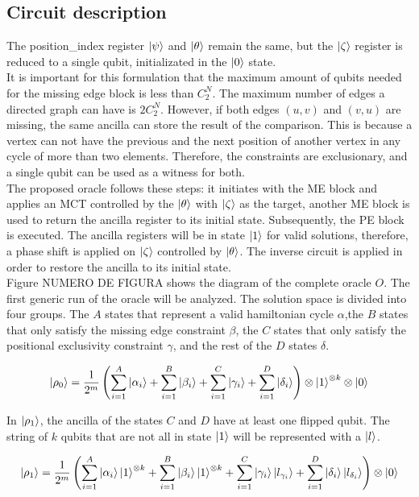 \documentclass[10pt,a4paper]{article}
\begin{document}
\subsection{Circuit description}
The position\_index register $\ket{\psi}$ and $\ket{\theta}$ remain the same, but the $\ket{\zeta}$ register is reduced to a single qubit, initializated in the $\ket{0}$ state.\\
It is important for this formulation that the maximum amount of qubits needed for the missing edge block is less than $C^N_2$. The maximum number of edges a directed graph can have is $2C^N_2$. However, if both edges $(u, v)$ and $(v, u)$ are missing, the same ancilla can store the result of the comparison. This is because a vertex can not have the previous and the next position of another vertex in any cycle of more than two elements. Therefore, the constraints are exclusionary, and a single qubit can be used as a witness for both.\\
The proposed oracle follows these steps: it initiates with the ME block and applies an MCT controlled by the $\ket{\theta}$ with $\ket{\zeta}$ as the target, another ME block is used to return the ancilla register to its initial state. Subsequently, the PE block is executed. The ancilla registers will be in state $\ket{1}$ for valid solutions, therefore, a phase shift is applied on $\ket{\zeta}$ controlled by $\ket{\theta}$. The inverse circuit is applied in order to restore the ancilla to its initial state.\\
Figure NUMERO DE FIGURA shows the diagram of the complete oracle $O$. The first generic run of the oracle will be analyzed. The solution space is divided into four groups. The $A$ states that represent a valid hamiltonian cycle $\alpha$,the $B$ states that only satisfy the missing edge constraint $\beta$, the $C$ states that only satisfy the positional exclusivity constraint $\gamma$, and the rest of the $D$ states $\delta$.

$$
\ket{\rho_0} = \frac{1}{2^m} \left( \sum_{i=1}^{A} \ket{\alpha_i} + \sum_{i=1}^{B} \ket{\beta_i} + \sum_{i=1}^{C} \ket{\gamma_i} + \sum_{i=1}^{D} \ket{\delta_i} \right) \otimes \ket{1}^{\otimes k} \otimes \ket{0}
$$

In $\ket{\rho_1}$, the ancilla of the states $C$ and $D$ have at least one flipped qubit. The string of $k$ qubits that are not all in state $\ket{1}$ will be represented with a $\ket{l}$.

$$
\ket{\rho_1} = \frac{1}{2^m} \left( \sum_{i=1}^{A} \ket{\alpha_i} \ket{1}^{\otimes k} + \sum_{i=1}^{B} \ket{\beta_i} \ket{1}^{\otimes k} + \sum_{i=1}^{C} \ket{\gamma_i} \ket{l_{\gamma_i}} + \sum_{i=1}^{D} \ket{\delta_i} \ket{l_{\delta_i}} \right) \otimes \ket{0}
$$
\end{document}
